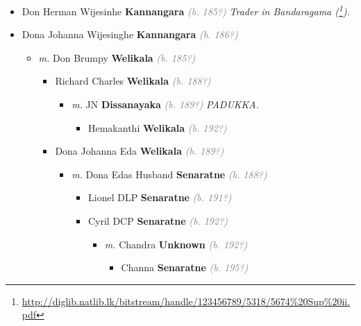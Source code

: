\documentclass[10pt, openany]{book}
\begin{document}
\begin{itemize}
{\begin{itemize}
{   }
\item{Don Herman Wijesinhe \textbf{Kannangara} \textcolor{gray}{\textit{(b. 185?)}} \textcolor{slmaroon}{\textit{Trader in Bandaragama (\footnote{\url{http://diglib.natlib.lk/bitstream/handle/123456789/5318/5674\%20Sup\%20ii.pdf}}).}}
   }
\item{Dona Johanna Wijesinghe \textbf{Kannangara} \textcolor{gray}{\textit{(b. 186?)}}
\begin{itemize}
\item{\textit{m.} Don Brumpy \textbf{Welikala} \textcolor{gray}{\textit{(b. 185?)}}   \label{couple:00000421:00000954} \begin{itemize}
\item{Richard Charles \textbf{Welikala} \textcolor{gray}{\textit{(b. 188?)}}
\begin{itemize}
\item{\textit{m.} JN \textbf{Dissanayaka} \textcolor{gray}{\textit{(b. 189?)}} \textcolor{slmaroon}{\textit{PADUKKA.}}   \label{couple:00000174:00000959} \begin{itemize}
\item{Hemakanthi \textbf{Welikala} \textcolor{gray}{\textit{(b. 192?)}}
 }
\end{itemize}}
\end{itemize}
  }
\item{Dona Johanna Eda \textbf{Welikala} \textcolor{gray}{\textit{(b. 189?)}}
\begin{itemize}
\item{\textit{m.} Dona Edas Husband \textbf{Senaratne} \textcolor{gray}{\textit{(b. 188?)}}   \label{couple:00000786:00000955} \begin{itemize}
\item{Lionel DLP \textbf{Senaratne} \textcolor{gray}{\textit{(b. 191?)}}
  }
\item{Cyril DCP \textbf{Senaratne} \textcolor{gray}{\textit{(b. 192?)}}
\begin{itemize}
\item{\textit{m.} Chandra \textbf{Unknown} \textcolor{gray}{\textit{(b. 192?)}}   \label{couple:00000782:00000863} \begin{itemize}
\item{Channa \textbf{Senaratne} \textcolor{gray}{\textit{(b. 195?)}}
 }

\end{itemize}}
\end{itemize}}
\end{itemize}}
\end{itemize}}
\end{itemize}}
\end{itemize}}
\end{itemize}}
\end{itemize}
\end{document}

